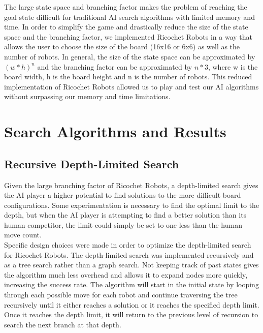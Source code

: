 \documentclass[a4paper,10pt]{article}
\begin{document}
The large state space and branching factor makes the problem of reaching the goal state difficult for traditional AI search algorithms with limited memory and time.
In order to simplify the game and drastically reduce the size of the state space and the branching factor, we implemented Ricochet Robots in a way that allows the
user to choose the size of the board (16x16 or 6x6) as well as the number of robots. In general, the size of the state space can be approximated by $(w*h)^n$ and
the branching factor can be approximated by $n*3$, where w is the board width, h is the board height and n is the number of robots.  This reduced implementation of
Ricochet Robots allowed us to play and test our AI algorithms without surpassing our memory and time limitations.


\section{Search Algorithms and Results}
\label{sec:searchAlgorithms}
  \subsection{Recursive Depth-Limited Search} \label{recursiveDFS}
  Given the large branching factor of Ricochet Robots, a depth-limited search gives the AI player a higher potential to find solutions to the more difficult board
  configurations.  Some experimentation is necessary to find the optimal limit to the depth, but when the AI player is attempting to find a better solution than
  its human competitor, the limit could simply be set to one less than the human move count.  \\

  Specific design choices were made in order to optimize the depth-limited search for Ricochet Robots.  The depth-limited search was implemented recursively and
  as a tree search rather than a graph search.  Not keeping track of past states gives the algorithm much less overhead and allows it to expand nodes more quickly,
  increasing the success rate.  The algorithm will start in the initial state by looping through each possible move for each robot and continue traversing the tree
  recursively until it either reaches a solution or it reaches the specified depth limit.  Once it reaches the depth limit, it will return to the previous level of
  recursion to search the next branch at that depth.  \\
\end{document}
